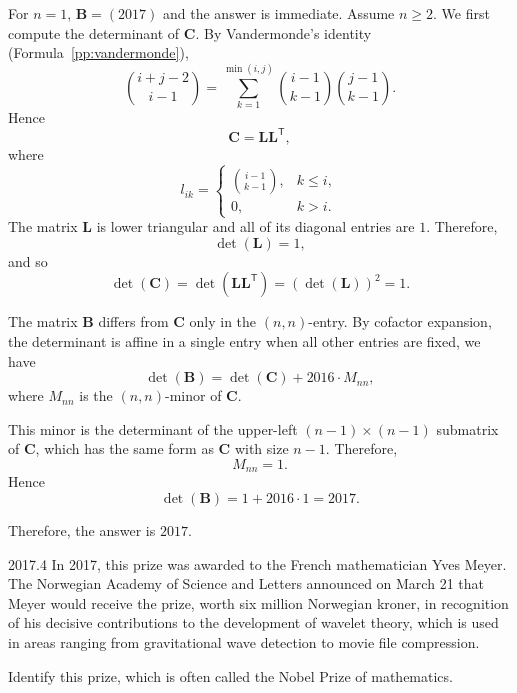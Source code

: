     \begin{solution}
        For $n=1$, $\mathbf{B}=(2017)$ and the answer is immediate. Assume $n\geq2$. We first compute the determinant of $\mathbf{C}$. By Vandermonde's identity (Formula~\ref{pp:vandermonde}),
        \[
            \binom{i+j-2}{i-1}
            =
            \sum_{k=1}^{\min(i,j)}
            \binom{i-1}{k-1}
            \binom{j-1}{k-1}.
        \]
        Hence
        \[
            \mathbf{C}=\mathbf{L}\mathbf{L}^{\mathsf T},
        \]
        where
        \[
            l_{ik}
            =
            \begin{cases}
                \binom{i-1}{k-1}, & k\leq i, \\
                0, & k>i.
            \end{cases}
        \]
        The matrix $\mathbf{L}$ is lower triangular and all of its diagonal entries are $1$.
        Therefore,
        \[
            \det(\mathbf{L})=1,
        \]
        and so
        \[
            \det(\mathbf{C})
            =
            \det(\mathbf{L}\mathbf{L}^{\mathsf T})
            =
            (\det(\mathbf{L}))^2
            =
            1.
        \]

        The matrix $\mathbf{B}$ differs from $\mathbf{C}$ only in the $(n,n)$-entry. By cofactor expansion, the
        determinant is affine in a single entry when all other entries are fixed, we have
        \[
            \det(\mathbf{B})
            =
            \det(\mathbf{C})
            +
            2016\cdot M_{nn},
        \]
        where $M_{nn}$ is the $(n,n)$-minor of $\mathbf{C}$.

        This minor is the determinant of the upper-left $(n-1)\times(n-1)$ submatrix of
        $\mathbf{C}$, which has the same form as $\mathbf{C}$ with size $n-1$. Therefore,
        \[
            M_{nn}=1.
        \]
        Hence
        \[
            \det(\mathbf{B})
            =
            1+2016\cdot 1
            =
            2017.
        \]

        Therefore, the answer is $\boxed{2017}$.
    \end{solution}

    \begin{pastproblem}{2017.4}
        In 2017, this prize was awarded to the French mathematician Yves Meyer. The Norwegian
        Academy of Science and Letters announced on March 21 that Meyer would receive the prize,
        worth six million Norwegian kroner, in recognition of his decisive contributions to the
        development of wavelet theory, which is used in areas ranging from gravitational wave
        detection to movie file compression.

        Identify this prize, which is often called the Nobel Prize of mathematics.
    \end{pastproblem}

